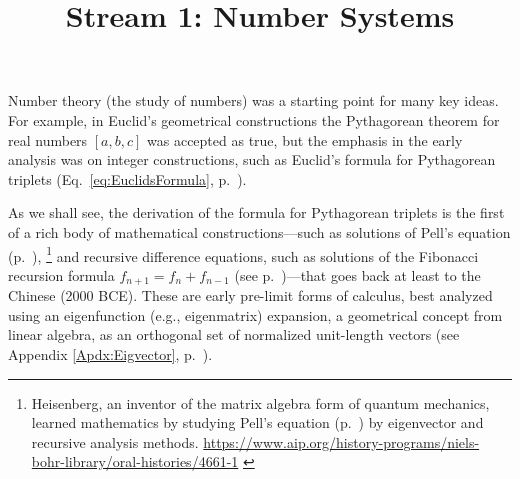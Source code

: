 \documentclass{ximera}
\title  %
	{Stream 1: Number Systems}
\begin{document}
\begin{abstract}
\end{abstract}
\maketitle
\label{Chap:NS} \label{Sect:NS}

Number theory (the study of numbers) was a starting point for many key ideas.
For example, in Euclid's geometrical constructions the Pythagorean theorem for real numbers $[a,b,c]$ was accepted as true,
but the emphasis in the early analysis was on integer constructions, such as Euclid's formula for Pythagorean triplets (Eq.~\ref{eq:EuclidsFormula}, p.~\pageref{eq:EuclidsFormula}).

As we shall see, the derivation of the formula for Pythagorean triplets is the first of a rich body of
mathematical constructions---such as solutions of Pell's equation (p.~\pageref{Lec 8}),%
 \footnote {Heisenberg, an inventor of the matrix algebra form of quantum mechanics, learned mathematics
by studying Pell's equation (p.~\pageref{Lec 8}) by eigenvector and recursive analysis methods. {\scriptsize \url{https://www.aip.org/history-programs/niels-bohr-library/oral-histories/4661-1}} \label{PellsEquation}
	}
and recursive difference equations, such as solutions of the Fibonacci recursion formula
$f_{n+1} = f_n + f_{n-1}$ (see p.~\pageref{Lec 9})---that goes back at least to the Chinese (2000 BCE).
These are early pre-limit forms of calculus, best analyzed using an eigenfunction
(e.g., eigenmatrix) expansion, a geometrical concept from linear algebra, as an orthogonal set of
normalized unit-length vectors (see Appendix \ref{Apdx:Eigvector}, p.~\pageref{Apdx:Eigvector}).

\end{document}
